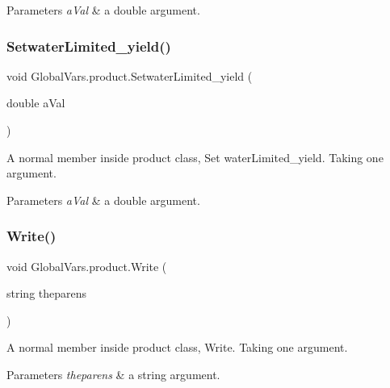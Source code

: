 \begin{DoxyParams}{Parameters}
{\em a\+Val} & a double argument. \\
\hline
\end{DoxyParams}
\mbox{\label{class_global_vars_1_1product_ab53d704f6a5d1b59bc932fc5a405419c}} 
\subsubsection{\texorpdfstring{SetwaterLimited\_yield()}{SetwaterLimited\_yield()}}
{\footnotesize\ttfamily void Global\+Vars.\+product.\+Setwater\+Limited\+\_\+yield (\begin{DoxyParamCaption}\item[{double}]{a\+Val }\end{DoxyParamCaption})\hspace{0.3cm}{\ttfamily [inline]}}



A normal member inside product class, Set water\+Limited\+\_\+yield. Taking one argument. 


\begin{DoxyParams}{Parameters}
{\em a\+Val} & a double argument. \\
\hline
\end{DoxyParams}
\mbox{\label{class_global_vars_1_1product_a5d04c99bd5f354667c9158942c3e0019}} 
\subsubsection{\texorpdfstring{Write()}{Write()}}
{\footnotesize\ttfamily void Global\+Vars.\+product.\+Write (\begin{DoxyParamCaption}\item[{string}]{theparens }\end{DoxyParamCaption})\hspace{0.3cm}{\ttfamily [inline]}}



A normal member inside product class, Write. Taking one argument. 


\begin{DoxyParams}{Parameters}
{\em theparens} & a string argument. \\
\hline
\end{DoxyParams}
\mbox{\label{class_global_vars_1_1product_a251b65f82d40438bd78bc7fdb8536e8b}} 
